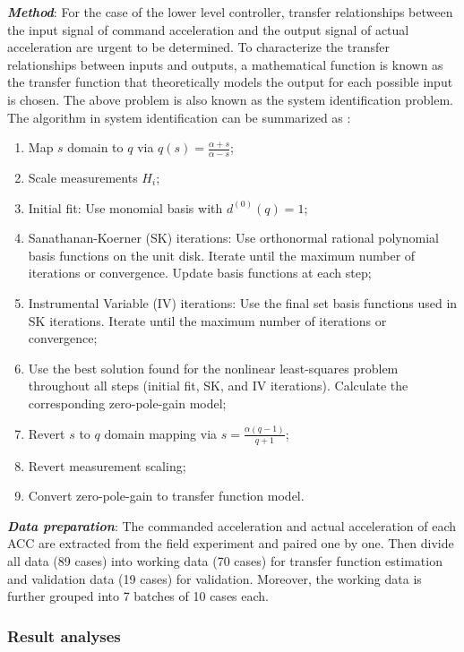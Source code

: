 \documentclass[journal]{IEEEtran}
\begin{document}
\textbf{\emph{Method}}: For the case of the lower level controller, transfer relationships between the input signal of command acceleration and the output signal of actual acceleration are urgent to be determined. To characterize the transfer relationships between inputs and outputs, a mathematical function is known as the transfer function that theoretically models the output for each possible input is chosen. The above problem is also known as the system identification problem. The algorithm in system identification can be summarized as \citep{Ozdemir2017,Kollar2006,Ljung1995}:
\begin{enumerate}
  \item Map $s$ domain to $q$ via $q(s)=\frac{\alpha+s}{\alpha-s}$;
  \item Scale measurements $H_i$;
  \item Initial fit: Use monomial basis with $d^{(0)}(q)=1$;
  \item Sanathanan-Koerner (SK) iterations: Use orthonormal rational polynomial basis functions on the unit disk. Iterate until the maximum number of iterations or convergence. Update basis functions at each step;
  \item Instrumental Variable (IV) iterations: Use the final set basis functions used in SK iterations. Iterate until the maximum number of iterations or convergence;
  \item Use the best solution found for the nonlinear least-squares problem throughout all steps (initial fit, SK, and IV iterations). Calculate the corresponding zero-pole-gain model;
  \item Revert $s$ to $q$ domain mapping via $s=\frac{\alpha(q-1)}{q+1}$;
  \item Revert measurement scaling;
  \item Convert zero-pole-gain to transfer function model.
\end{enumerate}

\textbf{\emph{Data preparation}}: The commanded acceleration and actual acceleration of each ACC are extracted from the field experiment and paired one by one. Then divide all data (89 cases) into working data (70 cases) for transfer function estimation and validation data (19 cases) for validation. Moreover, the working data is further grouped into 7 batches of 10 cases each.



\subsubsection{Result analyses}
\label{Section 3.3.2}
\end{document}
